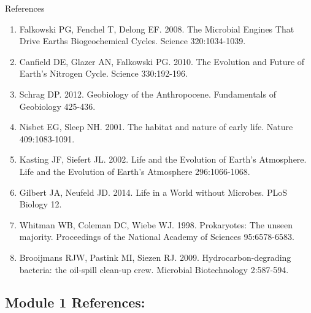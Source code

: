 \documentclass[]{article}
\providecommand{\tightlist}{%
  \setlength{\itemsep}{0pt}\setlength{\parskip}{0pt}}
\begin{document}
References

\begin{enumerate}
\def\labelenumi{\arabic{enumi}.}
\tightlist
\item
  Falkowski PG, Fenchel T, Delong EF. 2008. The Microbial Engines That
  Drive Earths Biogeochemical Cycles. Science 320:1034-1039.
\item
  Canfield DE, Glazer AN, Falkowski PG. 2010. The Evolution and Future
  of Earth's Nitrogen Cycle. Science 330:192-196.
\item
  Schrag DP. 2012. Geobiology of the Anthropocene. Fundamentals of
  Geobiology 425-436.
\item
  Nisbet EG, Sleep NH. 2001. The habitat and nature of early life.
  Nature 409:1083-1091.
\item
  Kasting JF, Siefert JL. 2002. Life and the Evolution of Earth's
  Atmosphere. Life and the Evolution of Earth's Atmosphere
  296:1066-1068.
\item
  Gilbert JA, Neufeld JD. 2014. Life in a World without Microbes. PLoS
  Biology 12.
\item
  Whitman WB, Coleman DC, Wiebe WJ. 1998. Prokaryotes: The unseen
  majority. Proceedings of the National Academy of Sciences
  95:6578-6583.
\item
  Brooijmans RJW, Pastink MI, Siezen RJ. 2009. Hydrocarbon-degrading
  bacteria: the oil-spill clean-up crew. Microbial Biotechnology
  2:587-594.
\end{enumerate}

\subsection{Module 1 References:}\label{module-1-references}
\end{document}
